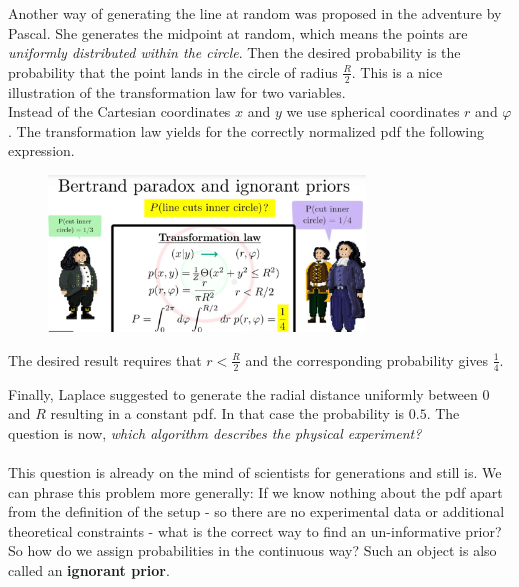 \documentclass[12pt, a4paper]{scrartcl}
\begin{document}
Another way of generating the line at random was proposed in the adventure
by Pascal. She generates the midpoint at random, which means the points
are \textit{uniformly distributed within the circle}. Then the desired probability is
the probability that the point lands in the circle of radius $\frac R2$. This is a nice
illustration of the transformation law for two variables.\\
Instead of the Cartesian coordinates $x$ and $y$ we use spherical coordinates $r$ and $\varphi$. The transformation law yields for the correctly normalized pdf the following expression. %
 \begin{figure}[H]
	\centering
	\includegraphics[width=0.75\textwidth]{8_7.png}
\end{figure}
The desired result requires that $r<\frac R2$ and the corresponding probability gives $\frac 14$.

Finally, Laplace suggested to generate the radial distance uniformly between 0 and $R$ resulting in a constant pdf. In that case the probability is $0.5$. 
The question is now, \textit{which algorithm describes the physical experiment?}\\

\\

This question is already on the mind of scientists for generations and still is.
We can phrase this problem more generally: If we know nothing about the
pdf apart from the definition of the setup - so there are no experimental
data or additional theoretical constraints - what is the correct way to find an
un-informative prior? So how do we assign probabilities in the continuous way?
Such an object is also called an \textbf{ignorant prior}.\\
\end{document}
